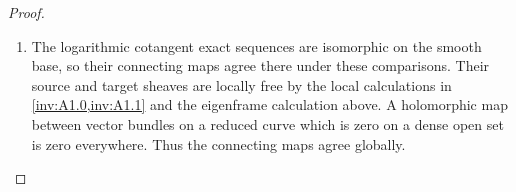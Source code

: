 \begin{proof}
\begin{enumerate}[label=\arabic*.,leftmargin=*]
\item The logarithmic cotangent exact sequences are isomorphic on the smooth
base, so their connecting maps agree there under these comparisons.
Their source and target sheaves are locally free by the local calculations
in \cref{inv:A1.0,inv:A1.1} and the eigenframe calculation above. A holomorphic map between
vector bundles on a reduced curve which is zero on a dense open set is
zero everywhere. Thus the connecting maps agree globally.
\end{enumerate}
\end{proof}